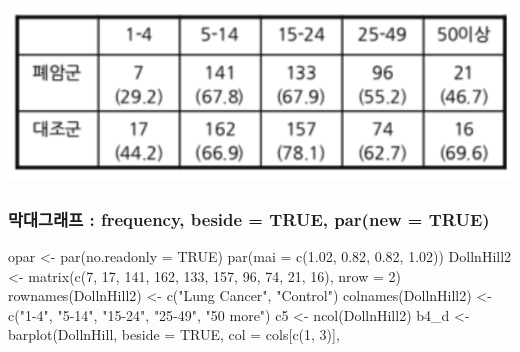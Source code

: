 \documentclass[
]{article}
\newenvironment{Shaded}{\begin{snugshade}}{\end{snugshade}}
\newcommand{\AttributeTok}[1]{\textcolor[rgb]{0.77,0.63,0.00}{#1}}
\newcommand{\ConstantTok}[1]{\textcolor[rgb]{0.00,0.00,0.00}{#1}}
\newcommand{\DecValTok}[1]{\textcolor[rgb]{0.00,0.00,0.81}{#1}}
\newcommand{\FloatTok}[1]{\textcolor[rgb]{0.00,0.00,0.81}{#1}}
\newcommand{\FunctionTok}[1]{\textcolor[rgb]{0.00,0.00,0.00}{#1}}
\newcommand{\NormalTok}[1]{#1}
\newcommand{\OtherTok}[1]{\textcolor[rgb]{0.56,0.35,0.01}{#1}}
\newcommand{\StringTok}[1]{\textcolor[rgb]{0.31,0.60,0.02}{#1}}
\begin{document}
\begin{flushleft}\includegraphics[width=0.35\linewidth]{../pics/DollnHill_Inhale} \end{flushleft}

\hypertarget{uxb9c9uxb300uxadf8uxb798uxd504-frequency-beside-true-parnew-true}{%
\subsubsection{막대그래프 : frequency, beside = TRUE, par(new =
TRUE)}\label{uxb9c9uxb300uxadf8uxb798uxd504-frequency-beside-true-parnew-true}}

\begin{Shaded}
\begin{Highlighting}[]
\NormalTok{opar }\OtherTok{\textless{}{-}} \FunctionTok{par}\NormalTok{(}\AttributeTok{no.readonly =} \ConstantTok{TRUE}\NormalTok{)}
\FunctionTok{par}\NormalTok{(}\AttributeTok{mai =} \FunctionTok{c}\NormalTok{(}\FloatTok{1.02}\NormalTok{, }\FloatTok{0.82}\NormalTok{, }\FloatTok{0.82}\NormalTok{, }\FloatTok{1.02}\NormalTok{))}
\NormalTok{DollnHill2 }\OtherTok{\textless{}{-}} \FunctionTok{matrix}\NormalTok{(}\FunctionTok{c}\NormalTok{(}\DecValTok{7}\NormalTok{, }\DecValTok{17}\NormalTok{, }\DecValTok{141}\NormalTok{, }\DecValTok{162}\NormalTok{, }\DecValTok{133}\NormalTok{, }\DecValTok{157}\NormalTok{, }\DecValTok{96}\NormalTok{, }\DecValTok{74}\NormalTok{, }\DecValTok{21}\NormalTok{, }\DecValTok{16}\NormalTok{), }
                     \AttributeTok{nrow =} \DecValTok{2}\NormalTok{)}
\FunctionTok{rownames}\NormalTok{(DollnHill2) }\OtherTok{\textless{}{-}} \FunctionTok{c}\NormalTok{(}\StringTok{"Lung Cancer"}\NormalTok{, }\StringTok{"Control"}\NormalTok{)}
\FunctionTok{colnames}\NormalTok{(DollnHill2) }\OtherTok{\textless{}{-}} \FunctionTok{c}\NormalTok{(}\StringTok{"1{-}4"}\NormalTok{, }\StringTok{"5{-}14"}\NormalTok{, }\StringTok{"15{-}24"}\NormalTok{, }\StringTok{"25{-}49"}\NormalTok{, }\StringTok{"50 more"}\NormalTok{)}
\NormalTok{c5 }\OtherTok{\textless{}{-}} \FunctionTok{ncol}\NormalTok{(DollnHill2)}
\NormalTok{b4\_d }\OtherTok{\textless{}{-}} \FunctionTok{barplot}\NormalTok{(DollnHill, }
                \AttributeTok{beside =} \ConstantTok{TRUE}\NormalTok{,}
                \AttributeTok{col =}\NormalTok{ cols[}\FunctionTok{c}\NormalTok{(}\DecValTok{1}\NormalTok{, }\DecValTok{3}\NormalTok{)],}

\end{Highlighting}
\end{Shaded}
\end{document}
